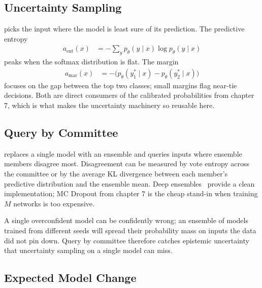 \subsection{Uncertainty Sampling}


 picks the input where the model is least sure of its prediction. The predictive entropy
\begin{align*}
    a_{\text{ent}}(x) &= -\sum_y p_\theta(y \mid x) \log p_\theta(y \mid x)
\end{align*}
peaks when the softmax distribution is flat. The margin
\begin{align*}
    a_{\text{mar}}(x) &= -\bigl(p_\theta(y_1^* \mid x) - p_\theta(y_2^* \mid x)\bigr)
\end{align*}
focuses on the gap between the top two classes; small margins flag near-tie decisions. Both are direct consumers of the calibrated probabilities from chapter 7, which is what makes the uncertainty machinery so reusable here.

\subsection{Query by Committee}

 replaces a single model with an ensemble and queries inputs where ensemble members disagree most. Disagreement can be measured by vote entropy across the committee or by the average KL divergence between each member's predictive distribution and the ensemble mean. Deep ensembles~\cite{Lakshminarayanan2017} provide a clean implementation; MC Dropout from chapter 7 is the cheap stand-in when training $M$ networks is too expensive.

 A single overconfident model can be confidently wrong; an ensemble of models trained from different seeds will spread their probability mass on inputs the data did not pin down. Query by committee therefore catches epistemic uncertainty that uncertainty sampling on a single model can miss.

\subsection{Expected Model Change}

